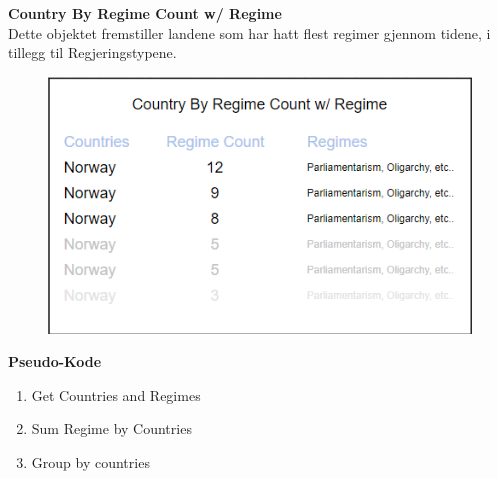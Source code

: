 \textbf{Country By Regime Count w/ Regime}\\
Dette objektet fremstiller landene som har hatt flest regimer gjennom tidene, i tillegg til 
Regjeringstypene.

\FigureCounter
\begin{figure}[H]
  \includegraphics[scale=1]{images/milepael4/countryByRegimeCountWithRegime.png}
\end{figure}

\textbf{Pseudo-Kode}
\begin{enumerate}
  \item Get Countries and Regimes
  \item Sum Regime by Countries
  \item Group by countries
\end{enumerate}